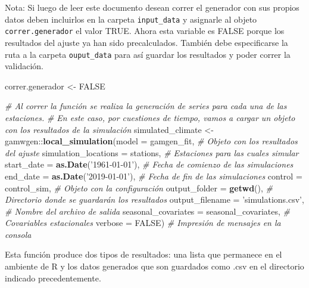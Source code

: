 \documentclass[
]{article}
\newenvironment{Shaded}{}{}
\newcommand{\CommentTok}[1]{\textcolor[rgb]{0.38,0.63,0.69}{\textit{#1}}}
\newcommand{\DataTypeTok}[1]{\textcolor[rgb]{0.56,0.13,0.00}{#1}}
\newcommand{\KeywordTok}[1]{\textcolor[rgb]{0.00,0.44,0.13}{\textbf{#1}}}
\newcommand{\NormalTok}[1]{#1}
\newcommand{\OperatorTok}[1]{\textcolor[rgb]{0.40,0.40,0.40}{#1}}
\newcommand{\OtherTok}[1]{\textcolor[rgb]{0.00,0.44,0.13}{#1}}
\newcommand{\StringTok}[1]{\textcolor[rgb]{0.25,0.44,0.63}{#1}}
\begin{document}
Nota: Si luego de leer este documento desean correr el generador con sus propios datos deben incluirlos en la carpeta \texttt{input\_data} y asignarle al objeto \texttt{correr.generador} el valor TRUE. Ahora esta variable es FALSE porque los resultados del ajuste ya han sido precalculados. También debe especificarse la ruta a la carpeta \texttt{ouput\_data} para así guardar los resultados y poder correr la validación.

\begin{Shaded}
\begin{Highlighting}[]
\NormalTok{correr.generador <-}\StringTok{ }\OtherTok{FALSE}
\end{Highlighting}
\end{Shaded}

\begin{Shaded}
\begin{Highlighting}[]
\CommentTok{# Al correr la función se realiza la generación de series para cada una de las estaciones. }
\CommentTok{# En este caso, por cuestiones de tiempo, vamos a cargar un objeto con los resultados de la simulación }
\NormalTok{simulated_climate <-}\StringTok{ }\NormalTok{gamwgen}\OperatorTok{::}\KeywordTok{local_simulation}\NormalTok{(}\DataTypeTok{model =}\NormalTok{ gamgen_fit, }\CommentTok{# Objeto con los resultados del ajuste}
    \DataTypeTok{simulation_locations =}\NormalTok{ stations, }\CommentTok{# Estaciones para las cuales simular}
    \DataTypeTok{start_date =} \KeywordTok{as.Date}\NormalTok{(}\StringTok{'1961-01-01'}\NormalTok{), }\CommentTok{# Fecha de comienzo de las simulaciones}
    \DataTypeTok{end_date =} \KeywordTok{as.Date}\NormalTok{(}\StringTok{'2019-01-01'}\NormalTok{), }\CommentTok{# Fecha de fin de las simulaciones}
    \DataTypeTok{control =}\NormalTok{ control_sim, }\CommentTok{# Objeto con la configuración}
    \DataTypeTok{output_folder =} \KeywordTok{getwd}\NormalTok{(), }\CommentTok{# Directorio donde se guardarán los resultados}
    \DataTypeTok{output_filename =} \StringTok{'simulations.csv'}\NormalTok{, }\CommentTok{# Nombre del archivo de salida}
    \DataTypeTok{seasonal_covariates =}\NormalTok{ seasonal_covariates, }\CommentTok{# Covariables estacionales}
    \DataTypeTok{verbose =} \OtherTok{FALSE}\NormalTok{) }\CommentTok{# Impresión de mensajes en la consola}
\end{Highlighting}
\end{Shaded}

Esta función produce dos tipos de resultados: una lista que permanece en el ambiente de R y los datos generados que son guardados como .csv en el directorio indicado precedentemente.
\end{document}
